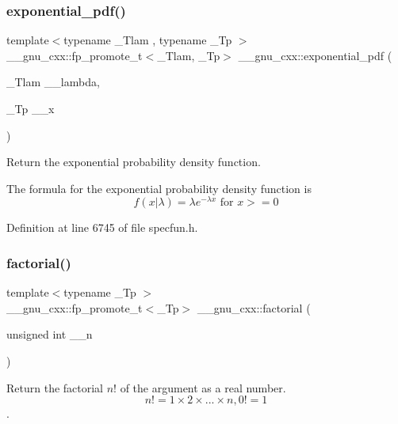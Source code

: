 \subsubsection{\texorpdfstring{exponential\+\_\+pdf()}{exponential\_pdf()}}
{\footnotesize\ttfamily template$<$typename \+\_\+\+Tlam , typename \+\_\+\+Tp $>$ \\
\+\_\+\+\_\+gnu\+\_\+cxx\+::fp\+\_\+promote\+\_\+t$<$\+\_\+\+Tlam, \+\_\+\+Tp$>$ \+\_\+\+\_\+gnu\+\_\+cxx\+::exponential\+\_\+pdf (\begin{DoxyParamCaption}\item[{\+\_\+\+Tlam}]{\+\_\+\+\_\+lambda,  }\item[{\+\_\+\+Tp}]{\+\_\+\+\_\+x }\end{DoxyParamCaption})\hspace{0.3cm}{\ttfamily [inline]}}



Return the exponential probability density function. 

The formula for the exponential probability density function is \[ f(x|\lambda) = \lambda e^{-\lambda x} \mbox{ for } x >= 0 \] 

Definition at line 6745 of file specfun.\+h.

\mbox{\label{group__mathsf__gnu_ga963b1612f50b0964f5f42c9f289aab68}} 
\subsubsection{\texorpdfstring{factorial()}{factorial()}}
{\footnotesize\ttfamily template$<$typename \+\_\+\+Tp $>$ \\
\+\_\+\+\_\+gnu\+\_\+cxx\+::fp\+\_\+promote\+\_\+t$<$\+\_\+\+Tp$>$ \+\_\+\+\_\+gnu\+\_\+cxx\+::factorial (\begin{DoxyParamCaption}\item[{unsigned int}]{\+\_\+\+\_\+n }\end{DoxyParamCaption})\hspace{0.3cm}{\ttfamily [inline]}}



Return the factorial $ n! $ of the argument as a real number. \[ n! = 1 \times 2 \times ... \times n, 0! = 1 \]. 



